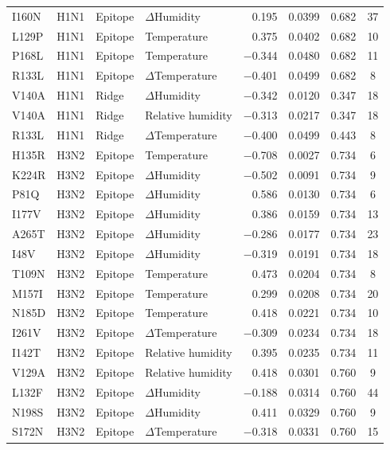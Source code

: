 \documentclass[12pt]{article}
\begin{document}
\begin{longtable}{llllrccc}
        I160N & H1N1 & Epitope & $\Delta$Humidity & 0.195 & 0.0399 & 0.682 & 37 \\
        L129P & H1N1 & Epitope & Temperature & 0.375 & 0.0402 & 0.682 & 10 \\
        P168L & H1N1 & Epitope & Temperature & $-$0.344 & 0.0480 & 0.682 & 11 \\
        R133L & H1N1 & Epitope & $\Delta$Temperature & $-$0.401 & 0.0499 & 0.682 & 8 \\
        V140A & H1N1 & Ridge & $\Delta$Humidity & $-$0.342 & 0.0120 & 0.347 & 18 \\
        V140A & H1N1 & Ridge & Relative humidity & $-$0.313 & 0.0217 & 0.347 & 18 \\
        R133L & H1N1 & Ridge & $\Delta$Temperature & $-$0.400 & 0.0499 & 0.443 & 8 \\
        H135R & H3N2 & Epitope & Temperature & $-$0.708 & 0.0027 & 0.734 & 6 \\
        K224R & H3N2 & Epitope & $\Delta$Humidity & $-$0.502 & 0.0091 & 0.734 & 9 \\
        P81Q & H3N2 & Epitope & $\Delta$Humidity & 0.586 & 0.0130 & 0.734 & 6 \\
        I177V & H3N2 & Epitope & $\Delta$Humidity & 0.386 & 0.0159 & 0.734 & 13 \\
        A265T & H3N2 & Epitope & $\Delta$Humidity & $-$0.286 & 0.0177 & 0.734 & 23 \\
        I48V & H3N2 & Epitope & $\Delta$Humidity & $-$0.319 & 0.0191 & 0.734 & 18 \\
        T109N & H3N2 & Epitope & Temperature & 0.473 & 0.0204 & 0.734 & 8 \\
        M157I & H3N2 & Epitope & Temperature & 0.299 & 0.0208 & 0.734 & 20 \\
        N185D & H3N2 & Epitope & Temperature & 0.418 & 0.0221 & 0.734 & 10 \\
        I261V & H3N2 & Epitope & $\Delta$Temperature & $-$0.309 & 0.0234 & 0.734 & 18 \\
        I142T & H3N2 & Epitope & Relative humidity & 0.395 & 0.0235 & 0.734 & 11 \\
        V129A & H3N2 & Epitope & Relative humidity & 0.418 & 0.0301 & 0.760 & 9 \\
        L132F & H3N2 & Epitope & $\Delta$Humidity & $-$0.188 & 0.0314 & 0.760 & 44 \\
        N198S & H3N2 & Epitope & $\Delta$Humidity & 0.411 & 0.0329 & 0.760 & 9 \\
        S172N & H3N2 & Epitope & $\Delta$Temperature & $-$0.318 & 0.0331 & 0.760 & 15 \\

\end{longtable}
\end{document}

